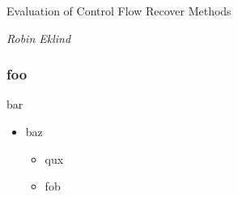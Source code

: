 \documentclass[aspectratio=1610]{beamer}
\begin{document}

\startpage

\begin{frame}

	\vspace{0.02\textheight}

	\begin{Large}
		Evaluation of Control Flow Recover Methods
	\end{Large}

	\vspace{0.1\textheight}

	\begin{small}
		\textit{Robin Eklind}
	\end{small}
\end{frame}


\normalpage

\begin{frame}
	\frametitle{foo}

	\begin{block}{bar}
		\begin{itemize}
			\item baz
			\begin{itemize}
				\item qux
				\item fob
			\end{itemize}
		\end{itemize}
	\end{block}
\end{frame}
\end{document}
